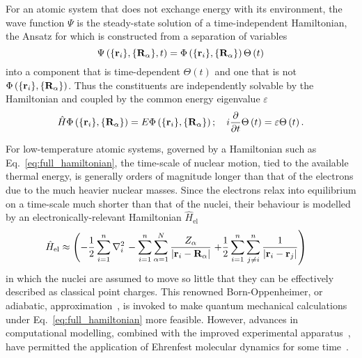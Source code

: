 For an atomic system 
{that does not exchange energy with its environment}, 
the wave function $\Psi$ is the steady-state 
solution of a time-independent Hamiltonian, 
{the Ansatz for which 
is constructed from a separation of variables}
%
\begin{equation}
\Psi \left(\{{\bf r}_i\},\{{\bf R_\alpha}\},t\right) 
= \Phi \left(\{{\bf r}_i\},\{{\bf R_\alpha}\}\right)\Theta\left(t\right) 
\end{equation}
%
into a component that is time-dependent 
$\Theta\left(t\right)$ 
and one that is not
$\Phi \left(\{{\bf r}_i\},\{{\bf R_\alpha}\}\right)$.
%
Thus the constituents are independently solvable 
by the Hamiltonian and coupled 
by the common energy eigenvalue $\varepsilon$
 \begin{equation}
 \hat H \Phi \left(\{{\bf r}_i\},\{{\bf R}_\alpha\}\right) 
 = E \Phi \left(\{{\bf r}_i\},\{{\bf R}_\alpha\}\right); 
 \quad 
i\frac{\partial}{\partial t}\Theta\left(t\right) = \varepsilon \Theta\left(t\right).
 \end{equation}

For low-temperature atomic systems, 
governed by a Hamiltonian such as Eq.~\eqref{eq:full_hamiltonian}, 
the time-scale of nuclear motion, 
tied to the available thermal energy, 
is generally orders of magnitude {longer} 
than that of the electrons 
due to the much heavier nuclear masses.
%
Since the electrons relax into equilibrium 
{on a time-scale much {shorter} than that} of the nuclei, 
their behaviour is modelled  
by an electronically-relevant Hamiltonian $\hat{H}_\textrm{el}$
%
\begin{align}
\hat {H}_\textrm{el}
\approx \left(-\frac{1}{2}\sum_{i=1}^n\nabla^2_i\right.
&- \sum_{i=1}^n\sum_{\alpha=1}^N\frac{Z_\alpha}{|{{{\bf r}}_i}-{\bf R_\alpha}|} \left.+ \frac{1}{2}\sum_{i=1}^n\sum_{j\neq i}^n\frac{1}{|{{\bf r}}_i-{{\bf r}}_j|}\right)
\label{eq:electron_hamiltonian}
\end{align}
%
in which the nuclei are assumed to move so little 
that they can be effectively described 
as classical point charges. 
%
This renowned Born-Oppenheimer, 
or adiabatic, approximation~\cite{ANDP:ANDP19273892002}, 
is invoked to make 
quantum mechanical calculations  
under Eq.~\eqref{eq:full_hamiltonian} 
more feasible.
%
{However, 
advances in computational modelling, 
combined with the improved experimental apparatus~\cite{PhysRevX.7.031035}, 
have permitted the application of Ehrenfest molecular dynamics 
for some time~\cite{0953-8984-16-7-L03,0953-8984-16-46-012}.}

